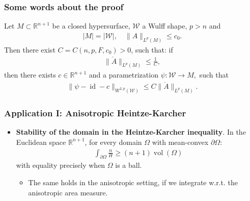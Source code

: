 \documentclass{beamer}
\newcommand{\cn}{\colon}
\newcommand{\sub}{\subset}
\newcommand{\mr}{\mathring}
\newcommand{\bbR}{\mathbb{R}}
\newcommand{\8}{\infty}
\newcommand{\Om}{\Omega}
\newcommand{\cW}{\mathcal{W}}
\newcommand{\cU}{\mathcal{U}}
\newcommand{\del}{\partial}
\newcommand{\n}{\nabla}
\newcommand{\fr}[2]{\frac{#1}{#2}}
\newcommand{\tfr}[2]{\tfrac{#1}{#2}}
\DeclareMathOperator{\id}{id}
\DeclareMathOperator{\vol}{vol}
\newcommand{\eq}[1]{\begin{equation}\begin{alignedat}{2} #1 \end{alignedat}\end{equation}}
\newcommand{\ra}{\rightarrow}
\newcommand{\q}{\quad}
\begin{document}
\begin{frame} 
\frametitle{Some words about the proof}

\begin{theorem}
Let $M\sub \bbR^{n+1}$ be a closed hypersurface, $\cW$ a Wulff shape, $p>n$ and 
\eq{|M| = |\cW|,\q \|A\|_{L^{p}(M)}\leq c_{0}.}
Then there exist $C = C(n,p,F,c_{0})>0$, such that: if
\eq{\|\mr{A}\|_{L^{p}(M)}\leq \tfr 1C,}
then there exists $c\in \bbR^{n+1}$ and a parametrization $\psi\cn \cW \ra M,$
such that
 \eq{\|\psi-\id-c\|_{W^{2,p}(\cW)}\leq C\|\mr{A}\|_{L^{p}(M)}.}
\end{theorem}

\end{frame}




\begin{frame} 
\frametitle{Application I: Anisotropic Heintze-Karcher}
\begin{itemize}
	\item {\textbf{Stability of the domain in the Heintze-Karcher inequality}}. In the Euclidean space $\bbR^{n+1}$, for every domain $\Om$ with mean-convex $\del\Om$:
			\eq{\int_{\del\Om}\fr{n}{H}\geq (n+1)\vol(\Om)}
	with equality precisely when $\Om$ is a ball.
	\begin{itemize}
		\item The same holds in the anisotropic setting, if we integrate w.r.t. the anisotropic area measure.
	\end{itemize}
	
	

\end{itemize}
\end{frame}
\end{document}
